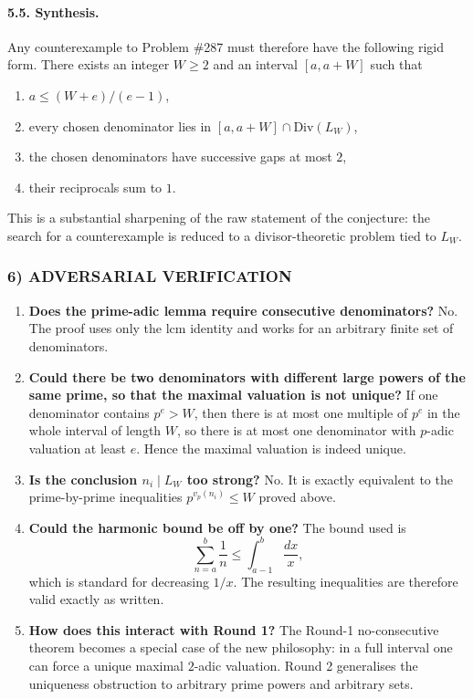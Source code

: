 \paragraph{5.5. Synthesis.}
Any counterexample to Problem \#287 must therefore have the following rigid form. There exists an integer $W\ge 2$ and an interval $[a,a+W]$ such that
\begin{enumerate}
\item $a\le (W+e)/(e-1)$,
\item every chosen denominator lies in $[a,a+W]\cap \mathrm{Div}(L_W)$,
\item the chosen denominators have successive gaps at most $2$,
\item their reciprocals sum to $1$.
\end{enumerate}
This is a substantial sharpening of the raw statement of the conjecture: the search for a counterexample is reduced to a divisor-theoretic problem tied to $L_W$.

\subsubsection*{6) ADVERSARIAL VERIFICATION}
\begin{enumerate}
\item \textbf{Does the prime-adic lemma require consecutive denominators?} No. The proof uses only the lcm identity and works for an arbitrary finite set of denominators.
\item \textbf{Could there be two denominators with different large powers of the same prime, so that the maximal valuation is not unique?} If one denominator contains $p^e>W$, then there is at most one multiple of $p^e$ in the whole interval of length $W$, so there is at most one denominator with $p$-adic valuation at least $e$. Hence the maximal valuation is indeed unique.
\item \textbf{Is the conclusion $n_i\mid L_W$ too strong?} No. It is exactly equivalent to the prime-by-prime inequalities $p^{v_p(n_i)}\le W$ proved above.
\item \textbf{Could the harmonic bound be off by one?} The bound used is
\[
\sum_{n=a}^{b}\frac1n\le \int_{a-1}^{b}\frac{dx}{x},
\]
which is standard for decreasing $1/x$. The resulting inequalities are therefore valid exactly as written.
\item \textbf{How does this interact with Round 1?} The Round-1 no-consecutive theorem becomes a special case of the new philosophy: in a full interval one can force a unique maximal $2$-adic valuation. Round 2 generalises the uniqueness obstruction to arbitrary prime powers and arbitrary sets.
\end{enumerate}

